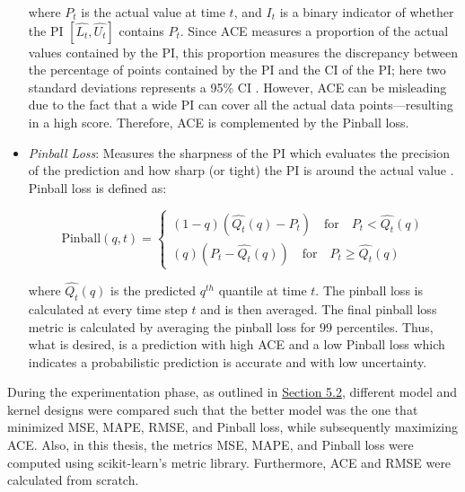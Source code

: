 \begin{itemize}
    where $P_t$ is the actual value at time $t$, and $I_t$ is a binary indicator of whether the PI $ [\hat{L_t}, \hat{U_t}]$ contains $P_t$. Since ACE measures a proportion of the actual values contained by the PI, this proportion measures the discrepancy between the percentage of points contained by the PI and the \ac{CI} of the PI; here two standard deviations represents a 95\% CI \cite{gp_prices}. However, ACE can be misleading due to the fact that a wide PI can cover all the actual data points—resulting in a high score. Therefore, ACE is complemented by the Pinball loss.
    
    \item \textit{Pinball Loss}: Measures the sharpness of the PI which evaluates the precision of the prediction and how sharp (or tight) the PI is around the actual value \cite{gp_prices}. Pinball loss is defined as:
    
    \begin{equation}
        \text{Pinball}(q, t) = 
        \begin{cases}
        (1 - q)(\hat{Q_t}(q) - P_t) \quad \text{for} \quad P_t < \hat{Q_t}(q) \\
        (q)(P_t - \hat{Q_t}(q)) \quad \text{for} \quad P_t \ge \hat{Q_t}(q) 
        \end{cases}    
    \end{equation}
    
    where $\hat{Q_t}(q)$ is the predicted $q^{th}$ quantile at time $t$. The pinball loss is calculated at every time step $t$ and is then averaged. The final pinball loss metric is calculated by averaging the pinball loss for $99$ percentiles. Thus, what is desired, is a prediction with high ACE and a low Pinball loss which indicates a probabilistic prediction is accurate and with low uncertainty.
    
\end{itemize}

During the experimentation phase, as outlined in \hyperlink{subsection.5.2}{Section 5.2}, different model and kernel designs were compared such that the better model was the one that minimized MSE, MAPE, RMSE, and Pinball loss, while subsequently maximizing ACE. Also, in this thesis, the metrics MSE, MAPE, and Pinball loss were computed using scikit-learn's \cite{scikit-learn} metric library. Furthermore, ACE and RMSE were calculated from scratch. 




